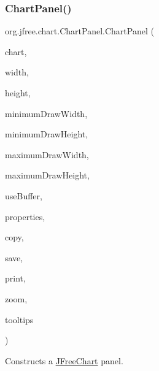 \subsubsection{\texorpdfstring{Chart\+Panel()}{ChartPanel()}\hspace{0.1cm}{\footnotesize\ttfamily [5/5]}}
{\footnotesize\ttfamily org.\+jfree.\+chart.\+Chart\+Panel.\+Chart\+Panel (\begin{DoxyParamCaption}\item[{\mbox{\hyperlink{classorg_1_1jfree_1_1chart_1_1_j_free_chart}{J\+Free\+Chart}}}]{chart,  }\item[{int}]{width,  }\item[{int}]{height,  }\item[{int}]{minimum\+Draw\+Width,  }\item[{int}]{minimum\+Draw\+Height,  }\item[{int}]{maximum\+Draw\+Width,  }\item[{int}]{maximum\+Draw\+Height,  }\item[{boolean}]{use\+Buffer,  }\item[{boolean}]{properties,  }\item[{boolean}]{copy,  }\item[{boolean}]{save,  }\item[{boolean}]{print,  }\item[{boolean}]{zoom,  }\item[{boolean}]{tooltips }\end{DoxyParamCaption})}

Constructs a \mbox{\hyperlink{classorg_1_1jfree_1_1chart_1_1_j_free_chart}{J\+Free\+Chart}} panel.


